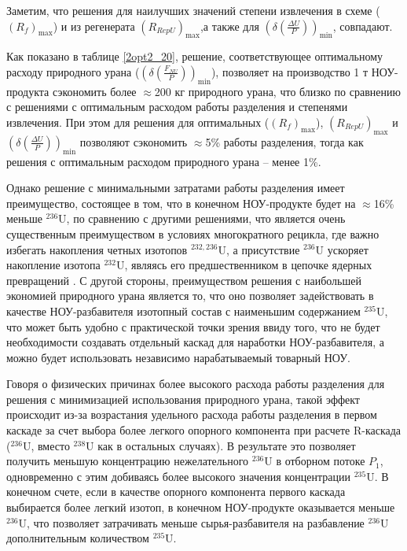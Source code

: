 Заметим, что решения для наилучших значений степени извлечения в схеме ($(R_{f})_\text{max}$) и из регенерата $(R_{RepU})_\text{max}$,а также для $(\delta(\frac{\Delta U}{P}))_\text{min}$, совпадают. 

Как показано в таблице \ref{2opt2_20}, решение, соответствующее оптимальному расходу природного урана ($(\delta(\frac{F_{NU}}{P}))_\text{min}$), позволяет на производство 1 т НОУ-продукта сэкономить более $\approx$200 кг природного урана, что близко по сравнению с решениями с оптимальным расходом работы разделения и степенями извлечения. При этом для решения для оптимальных ($(R_{f})_\text{max}$), $(R_{RepU})_\text{max}$ и $(\delta(\frac{\Delta U}{P}))_\text{min}$ позволяют сэкономить $\approx$5\% работы разделения, тогда как решения с оптимальным расходом природного урана -- менее 1\%.

Однако решение с минимальными затратами работы разделения имеет преимущество, состоящее в том, что в конечном НОУ-продукте будет на $\approx$16\% меньше $^{236}$U, по сравнению с другими решениями, что является очень существенным преимуществом в условиях многократного рецикла, где важно избегать накопления четных изотопов $^{232,236}$U, а присутствие $^{236}$U ускоряет накопление изотопа $^{232}$U, являясь его предшественником в цепочке ядерных превращений \cite{smirnovEvolutionIsotopicComposition2012}. С другой стороны, преимуществом решения с наибольшей экономией природного урана является то, что оно позволяет задействовать в качестве НОУ-разбавителя изотопный состав с наименьшим содержанием $^{235}$U, что может быть удобно с практической точки зрения ввиду того, что не будет необходимости создавать отдельный каскад для наработки НОУ-разбавителя, а можно будет использовать независимо нарабатываемый товарный НОУ. 

Говоря о физических причинах более высокого расхода работы разделения для решения с минимизацией использования природного урана, такой эффект происходит из-за возрастания удельного расхода работы разделения в первом каскаде за счет выбора более легкого опорного компонента при расчете R-каскада ($^{236}$U, вместо $^{238}$U как в остальных случаях). В результате это позволяет получить меньшую концентрацию нежелательного $^{236}$U в отборном потоке $P_{1}$, одновременно с этим добиваясь более высокого значения концентрации $^{235}$U. В конечном счете, если в качестве опорного компонента первого каскада выбирается более легкий изотоп, в конечном НОУ-продукте оказывается меньше $^{236}$U, что позволяет затрачивать меньше сырья-разбавителя на разбавление $^{236}$U дополнительным количеством $^{235}$U.

